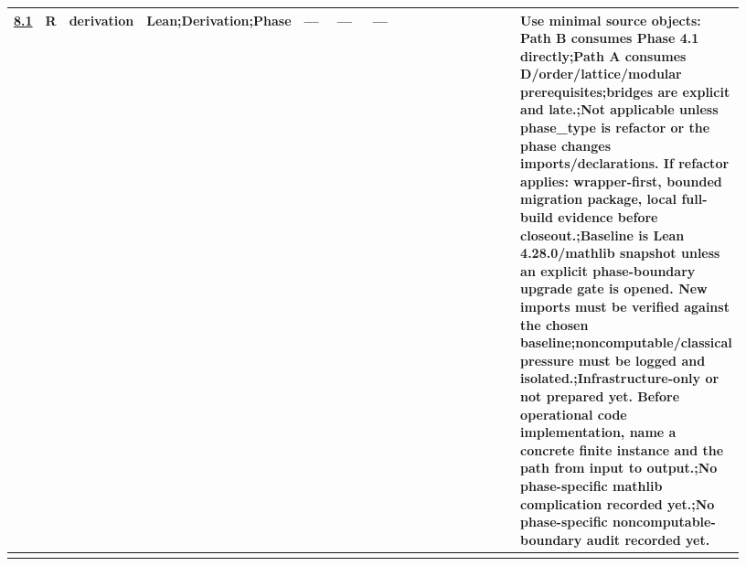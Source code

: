 \begin{longtable}{L{0.026\linewidth} L{0.024\linewidth} L{0.045\linewidth} L{0.07\linewidth} L{0.065\linewidth} L{0.075\linewidth} L{0.11\linewidth} L{0.19\linewidth} L{0.155\linewidth} L{0.17\linewidth}}
\hyperlink{phase-row-8-1}{8.1} & R & derivation & Lean;\newline Derivation;\newline Phase & --- & --- & --- &  &  & Use minimal source objects: Path B consumes Phase 4.1 directly;\newline Path A consumes D/\allowbreak{}order/\allowbreak{}lattice/\allowbreak{}modular prerequisites;\newline bridges are explicit and late.;\newline Not applicable unless phase\_type is refactor or the phase changes imports/\allowbreak{}declarations. If refactor applies: wrapper-first, bounded migration package, local full-build evidence before closeout.;\newline Baseline is Lean 4.28.0/\allowbreak{}mathlib snapshot unless an explicit phase-boundary upgrade gate is opened. New imports must be verified against the chosen baseline;\newline noncomputable/\allowbreak{}classical pressure must be logged and isolated.;\newline Infrastructure-only or not prepared yet. Before operational code implementation, name a concrete finite instance and the path from input to output.;\newline No phase-specific mathlib complication recorded yet.;\newline No phase-specific noncomputable-boundary audit recorded yet.\\
\hline
\addlinespace[0.24em]

\end{longtable}
